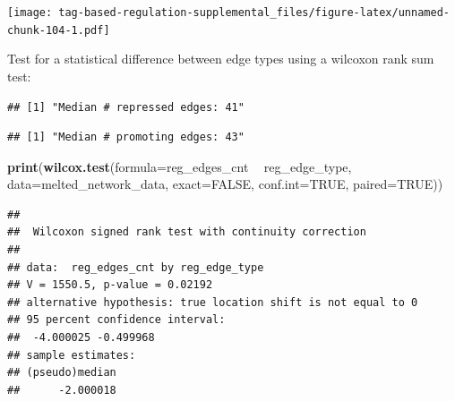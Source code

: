 \documentclass[]{book}
\newenvironment{Shaded}{\begin{snugshade}}{\end{snugshade}}
\newcommand{\DataTypeTok}[1]{\textcolor[rgb]{0.13,0.29,0.53}{#1}}
\newcommand{\KeywordTok}[1]{\textcolor[rgb]{0.13,0.29,0.53}{\textbf{#1}}}
\newcommand{\NormalTok}[1]{#1}
\newcommand{\OperatorTok}[1]{\textcolor[rgb]{0.81,0.36,0.00}{\textbf{#1}}}
\newcommand{\OtherTok}[1]{\textcolor[rgb]{0.56,0.35,0.01}{#1}}
\newcommand{\StringTok}[1]{\textcolor[rgb]{0.31,0.60,0.02}{#1}}
\begin{document}
\texttt{[image: tag-based-regulation-supplemental\_files/figure-latex/unnamed-chunk-104-1.pdf]}

Test for a statistical difference between edge types using a wilcoxon rank sum test:

\begin{Shaded}
\end{Shaded}

\begin{verbatim}
## [1] "Median # repressed edges: 41"
\end{verbatim}

\begin{Shaded}
\end{Shaded}

\begin{verbatim}
## [1] "Median # promoting edges: 43"
\end{verbatim}

\begin{Shaded}
\begin{Highlighting}[]
\KeywordTok{print}\NormalTok{(}\KeywordTok{wilcox.test}\NormalTok{(}\DataTypeTok{formula=}\NormalTok{reg_edges_cnt }\OperatorTok{~}\StringTok{ }\NormalTok{reg_edge_type, }\DataTypeTok{data=}\NormalTok{melted_network_data, }\DataTypeTok{exact=}\OtherTok{FALSE}\NormalTok{, }\DataTypeTok{conf.int=}\OtherTok{TRUE}\NormalTok{, }\DataTypeTok{paired=}\OtherTok{TRUE}\NormalTok{))}
\end{Highlighting}
\end{Shaded}

\begin{verbatim}
## 
##  Wilcoxon signed rank test with continuity correction
## 
## data:  reg_edges_cnt by reg_edge_type
## V = 1550.5, p-value = 0.02192
## alternative hypothesis: true location shift is not equal to 0
## 95 percent confidence interval:
##  -4.000025 -0.499968
## sample estimates:
## (pseudo)median 
##      -2.000018
\end{verbatim}
\end{document}
